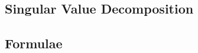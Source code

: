 \documentclass[journal]{IEEEtran}
\begin{document}
\subsection{Singular Value Decomposition}
%
\subsection{Formulae}

%
\appendices
%
\newpage
\end{document}
